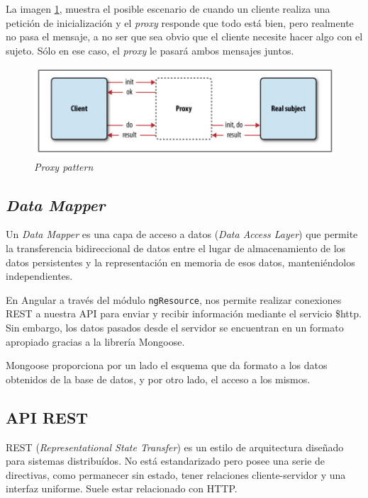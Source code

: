 La imagen \ref{fig:proxy}, muestra el posible escenario de cuando un cliente realiza una petición de inicialización y el \textit{proxy} responde que todo está bien, pero realmente no pasa el mensaje, a no ser que sea obvio que el cliente necesite hacer algo con el sujeto. Sólo en ese caso, el \textit{proxy} le pasará ambos mensajes juntos\cite{stoyanstefanov2010}.
 

\begin{figure}[htbp] 
    \centering
    \includegraphics[width=1\textwidth]{figuras/proxy_pattern.png}
    \caption{\textit{Proxy pattern}\cite{stoyanstefanov2010}}
    \label{fig:proxy}
\end{figure}	


\subsection{\textit{Data Mapper}}
Un \textit{Data Mapper} es una capa de acceso a datos (\textit{Data Access Layer}) que permite la transferencia bidireccional de datos entre el lugar de almacenamiento de los datos persistentes y la representación en memoria de esos datos, manteniéndolos independientes\cite{mgechev}.


En Angular a través del módulo \texttt{ngResource}, nos permite realizar conexiones REST a nuestra API para enviar y recibir información mediante el servicio \$http. Sin embargo, los datos pasados desde el servidor se encuentran en un formato apropiado gracias a la librería Mongoose.


Mongoose proporciona por un lado el esquema que da formato a los datos obtenidos de la base de datos, y por otro lado, el acceso a los mismos. 


\subsection{API REST}
REST (\textit{Representational State Transfer}) es un estilo de arquitectura diseñado para sistemas distribuídos. No está estandarizado pero posee una serie de directivas, como permanecer sin estado, tener relaciones cliente-servidor y una interfaz uniforme. Suele estar relacionado con HTTP.


